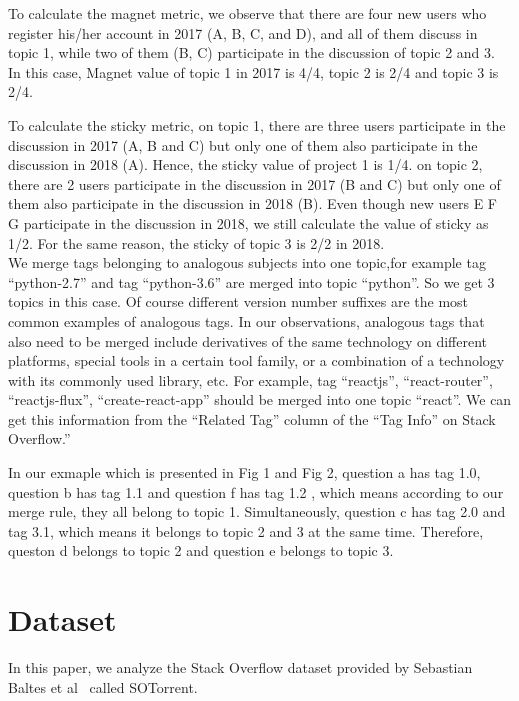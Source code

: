 \documentclass[conference]{IEEEtran}
\begin{document}
To calculate the magnet metric, we observe that there are four new users who register his/her account in 2017 (A, B, C, and D), and all of them discuss in topic 1, while two of them (B, C) participate in the discussion of topic 2 and 3. In this case, Magnet value of topic 1 in 2017 is 4/4, topic 2 is 2/4 and topic 3 is 2/4.

To calculate the sticky metric, on topic 1, there are three users participate in the discussion in 2017 (A, B and C) but only one of them also participate in the discussion in 2018 (A). Hence, the sticky value of project 1 is 1/4. on topic 2, there are 2 users participate in the discussion in 2017 (B and C) but only one of them also participate in the discussion in 2018 (B). Even though new users E F G participate in the discussion in 2018, we still calculate the value of sticky as 1/2. For the same reason, the sticky of topic 3 is 2/2 in 2018.\\

We merge tags belonging to analogous subjects into one topic,for example tag ``python-2.7'' and tag ``python-3.6'' are merged into topic ``python''. So we get 3 topics in this case. 
Of course different version number suffixes are the most common examples of analogous tags. In our observations, analogous tags that also need to be merged include derivatives of the same technology on different platforms, special tools in a certain tool family, or a combination of a technology with its commonly used library, etc. For example, tag ``reactjs'', ``react-router'', ``reactjs-flux'', ``create-react-app'' should be merged into one topic ``react''.
We can get this information from the ``Related Tag'' column of the ``Tag Info'' on Stack Overflow.''

In our exmaple which is presented in Fig 1 and Fig 2,  question a has tag 1.0, question b has tag 1.1 and question f has tag 1.2 , which means according to our merge rule, they all belong to topic 1.  Simultaneously, question c has tag 2.0 and tag 3.1, which means it belongs to topic 2 and 3 at the same time. Therefore, queston d belongs to topic 2 and question e belongs to topic 3.

\section{Dataset}
In this paper, we analyze the Stack Overflow dataset provided by Sebastian Baltes et al~\cite{msr2019challenge} called SOTorrent. 
\end{document}

